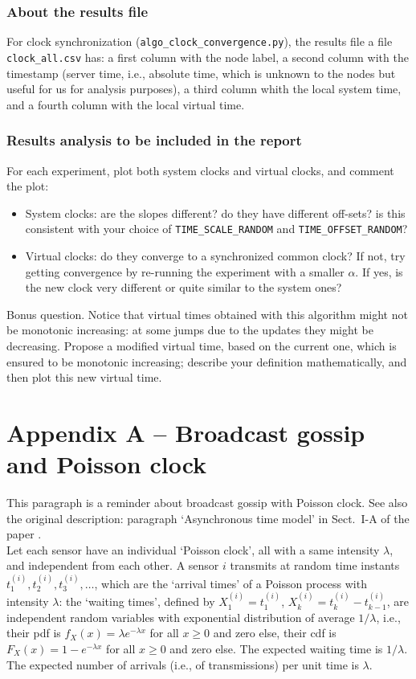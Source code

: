 \documentclass[oneside]{article}
\begin{document}
\subsubsection{About the results file}

For clock synchronization (\verb=algo_clock_convergence.py=),
the results file
a file \verb=clock_all.csv= has:
a first column with the node label, 
a second column with the timestamp (server time, i.e., absolute time, which is unknown to the nodes but useful for us for analysis purposes), 
a third column whith the local system time, 
and a fourth column with the local virtual time.


\subsubsection{Results analysis to be included in the report}

For each experiment, plot both system clocks and virtual clocks, and comment the plot:
\begin{itemize}
	\item System clocks: are the slopes different? do they have different off-sets? is this consistent with your choice of \verb=TIME_SCALE_RANDOM= and \verb=TIME_OFFSET_RANDOM=?
	\item Virtual clocks: do they converge to a synchronized common clock? If not, try getting convergence by re-running the experiment with a smaller $\alpha$. If yes, is the new clock very different or quite similar to the system ones?
\end{itemize}
Bonus question. Notice that virtual times obtained with this algorithm might not be monotonic increasing: at some jumps due to the updates they might be decreasing. Propose a modified virtual time, based on the current one, which is ensured to be monotonic increasing; describe your definition mathematically, and then plot this new virtual time.


\newpage
\section*{Appendix A -- Broadcast gossip and Poisson clock}
This paragraph is a reminder about broadcast gossip with Poisson clock. See also the original description: paragraph `Asynchronous time model' in Sect.~I-A of the paper \cite{gossip-poisson}.\\

Let each sensor have an individual `Poisson clock', all with a same intensity $\lambda$, and independent from each other. A sensor $i$ transmits at random time instants $t_1^{(i)}, t_2^{(i)}, t_3^{(i)}, \dots$, which are the `arrival times' of a Poisson process with intensity $\lambda$: the `waiting times', defined by $X_1^{(i)} = t_1^{(i)}$, $X_k^{(i)} = t_k^{(i)}-t_{k-1}^{(i)}$, are independent random variables with exponential distribution of average $1/\lambda$, i.e., their pdf is $f_X(x) = \lambda e^{-\lambda x}$ for all $x \ge 0$ and zero else, their cdf is $F_X(x) = 1 - e^{-\lambda x} $ for all $x \ge 0$ and zero else. The expected waiting time is $1/\lambda$. The expected number of arrivals (i.e., of transmissions) per unit time is $\lambda$.\\
\end{document}
